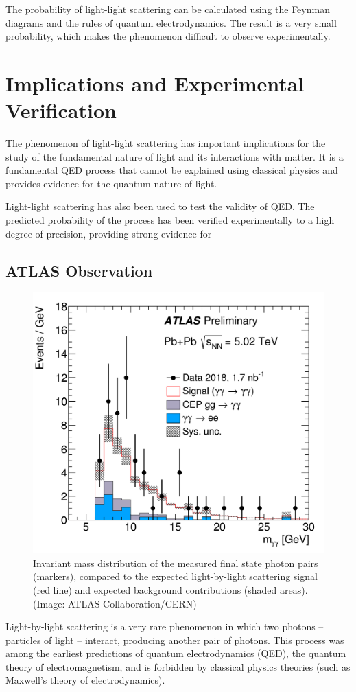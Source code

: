 \documentclass{article}
\begin{document}
The probability of light-light scattering can be calculated using the Feynman diagrams and the rules of quantum electrodynamics. The result is a very small probability, which makes the phenomenon difficult to observe experimentally.

\section{Implications and Experimental Verification}

The phenomenon of light-light scattering has important implications for the study of the fundamental nature of light and its interactions with matter. It is a fundamental QED process that cannot be explained using classical physics and provides evidence for the quantum nature of light.

Light-light scattering has also been used to test the validity of QED. The predicted probability of the process has been verified experimentally to a high degree of precision, providing strong evidence for

\subsection{ATLAS Observation}

\begin{figure}[ht]
	\centering
	\includegraphics[width=0.5\linewidth]{figures/LbyL-fig2.png}
	\caption{Invariant mass distribution of the measured final state photon pairs (markers), compared
		to the expected light-by-light scattering signal (red line) and expected background contributions
		(shaded areas). (Image: ATLAS Collaboration/CERN)}
	\label{fig:Atlas data}
\end{figure}
Light-by-light scattering is a very rare phenomenon in which two photons – particles of light – interact,
producing another pair of photons. This process was among the earliest predictions of quantum electrodynamics (QED),
the quantum theory of electromagnetism, and is forbidden by classical physics theories (such as
Maxwell's theory of electrodynamics).
\end{document}
